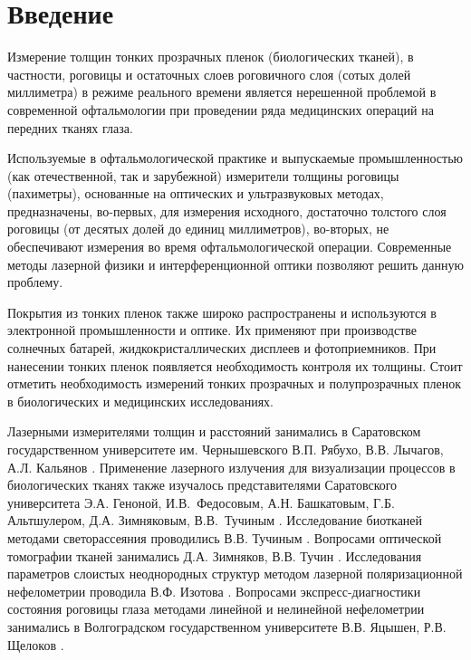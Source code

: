 
\section*{Введение}
Измерение толщин тонких прозрачных пленок (биологических тканей), в частности, роговицы и остаточных слоев роговичного слоя (сотых долей миллиметра) в режиме реального времени является нерешенной проблемой в современной офтальмологии при проведении ряда медицинских операций на передних тканях глаза.


Используемые в офтальмологической практике и выпускаемые промышленностью (как отечественной, так и зарубежной) измерители толщины роговицы (пахиметры), основанные на оптических и ультразвуковых методах, предназначены, во-первых, для измерения исходного, достаточно толстого слоя роговицы (от десятых долей до единиц миллиметров), во-вторых, не обеспечивают измерения во время офтальмологической операции. Современные методы лазерной физики и интерференционной оптики позволяют решить данную проблему.


Покрытия из тонких пленок также широко распространены и используются в электронной промышленности и оптике. Их применяют при производстве солнечных батарей, жидкокристаллических дисплеев и фотоприемников. При нанесении тонких пленок появляется необходимость контроля их толщины. Стоит отметить необходимость измерений тонких прозрачных и полупрозрачных пленок в биологических и медицинских исследованиях.


Лазерными измерителями толщин и расстояний занимались в Саратовском государственном университете им. Чернышевского
В.П. Рябухо, В.В. Лычагов, А.Л. Кальянов \cite{lichagov}.
Применение лазерного излучения для визуализации процессов в биологических тканях также изучалось представителями Саратовского университета Э.А. Геноной, И.В.~Федосовым, А.Н. Башкатовым, Г.Б. Альтшулером, Д.А. Зимняковым, В.В.~Тучиным \cite{genina}. Исследование биотканей методами светорассеяния проводились В.В. Тучиным \cite{tuchin}. Вопросами оптической томографии тканей занимались Д.А. Зимняков, В.В. Тучин \cite{zimnyakov}.
Исследования параметров слоистых неоднородных структур методом лазерной поляризационной нефелометрии проводила В.Ф. Изотова \cite{izotova}.
Вопросами экспресс-диагностики состояния роговицы глаза методами линейной и нелинейной нефелометрии занимались в Волгоградском государственном университете В.В. Яцышен, Р.В. Щелоков \cite{zimnyakov, shcelok}.


